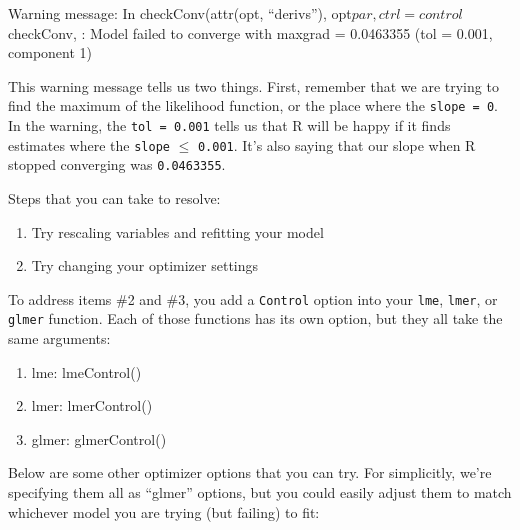 \documentclass[
  letterpaper,
  DIV=11,
  numbers=noendperiod]{scrreprt}
\begin{document}
Warning message: In checkConv(attr(opt, ``derivs''),
opt\(par, ctrl = control\)checkConv, : Model failed to converge with
max\textbar grad\textbar{} = 0.0463355 (tol = 0.001, component 1)

This warning message tells us two things. First, remember that we are
trying to find the maximum of the likelihood function, or the place
where the \texttt{slope\ =\ 0}. In the warning, the
\texttt{tol\ =\ 0.001} tells us that R will be happy if it finds
estimates where the \texttt{slope} \(\leq\) \texttt{0.001}. It's also
saying that our slope when R stopped converging was \texttt{0.0463355}.

Steps that you can take to resolve:

\begin{enumerate}
  \item Try rescaling variables and refitting your model
  \item Try changing your optimizer settings
\end{enumerate}

To address items \#2 and \#3, you add a \texttt{Control} option into
your \texttt{lme}, \texttt{lmer}, or \texttt{glmer} function. Each of
those functions has its own option, but they all take the same
arguments:

\begin{enumerate}
  \item lme: lmeControl()
  \item lmer: lmerControl()
  \item glmer: glmerControl()
\end{enumerate}

Below are some other optimizer options that you can try. For
simplicitly, we're specifying them all as ``glmer'' options, but you
could easily adjust them to match whichever model you are trying (but
failing) to fit:
\end{document}
